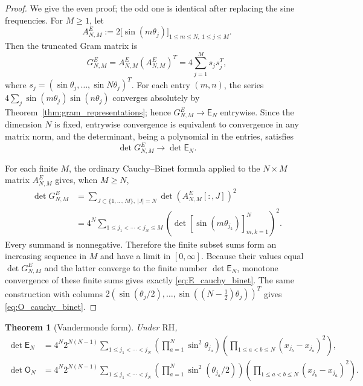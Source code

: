 \documentclass[preprint,12pt]{elsarticle}
\numberwithin{equation}{section}
\theoremstyle{plain}
\newtheorem{theorem}{Theorem}[section]
\theoremstyle{definition}
\theoremstyle{remark}
\newcommand{\RH}{\mathrm{RH}}
\newcommand{\E}{\mathsf E}
\newcommand{\Omat}{\mathsf O}
\begin{document}
\begin{proof}
We give the even proof; the odd one is identical after replacing the sine frequencies.  For $M\ge1$, let
\begin{equation}
A_{N,M}^E:=2\bigl[\sin(m\theta_j)\bigr]_{1\le m\le N,\ 1\le j\le M}.
\end{equation}
Then the truncated Gram matrix is
\begin{equation}
G_{N,M}^E=A_{N,M}^E(A_{N,M}^E)^T
=4\sum_{j=1}^{M}s_j s_j^T,
\end{equation}
where $s_j=(\sin\theta_j,\ldots,\sin N\theta_j)^T$.  For each entry $(m,n)$, the series
$4\sum_j\sin(m\theta_j)\sin(n\theta_j)$ converges absolutely by Theorem~\ref{thm:gram_representations}; hence $G_{N,M}^E\to\E_N$ entrywise.  Since the dimension $N$ is fixed, entrywise convergence is equivalent to convergence in any matrix norm, and the determinant, being a polynomial in the entries, satisfies
\begin{equation}
\det G_{N,M}^E\longrightarrow\det\E_N.
\end{equation}

For each finite $M$, the ordinary Cauchy--Binet formula applied to the $N\times M$ matrix $A_{N,M}^E$ gives, when $M\ge N$,
\begin{align}
\det G_{N,M}^E
&=\sum_{J\subset\{1,\ldots,M\},\ |J|=N}\det(A_{N,M}^E[:,J])^2\\
&=4^N\sum_{1\le j_1<\cdots<j_N\le M}
\left(\det[\sin(m\theta_{j_k})]_{m,k=1}^{N}\right)^2.
\end{align}
Every summand is nonnegative.  Therefore the finite subset sums form an increasing sequence in $M$ and have a limit in $[0,\infty]$.  Because their values equal $\det G_{N,M}^E$ and the latter converge to the finite number $\det\E_N$, monotone convergence of these finite sums gives exactly \eqref{eq:E_cauchy_binet}.  The same construction with columns
$2(\sin(\theta_j/2),\ldots,\sin((N-\tfrac12)\theta_j))^T$ gives \eqref{eq:O_cauchy_binet}.
\end{proof}

\begin{theorem}[Vandermonde form]
\label{thm:vandermonde_form}
Under $\RH$,
\begin{align}
\det\E_N
&=4^N2^{N(N-1)}
\sum_{1\le j_1<\cdots<j_N}
\left(\prod_{a=1}^N\sin^2\theta_{j_a}\right)
\left(\prod_{1\le a<b\le N}(x_{j_b}-x_{j_a})^2\right),
\label{eq:E_vandermonde}\\
\det\Omat_N
&=4^N2^{N(N-1)}
\sum_{1\le j_1<\cdots<j_N}
\left(\prod_{a=1}^N\sin^2(\theta_{j_a}/2)\right)
\left(\prod_{1\le a<b\le N}(x_{j_b}-x_{j_a})^2\right).
\label{eq:O_vandermonde}
\end{align}
\end{theorem}
\end{document}
